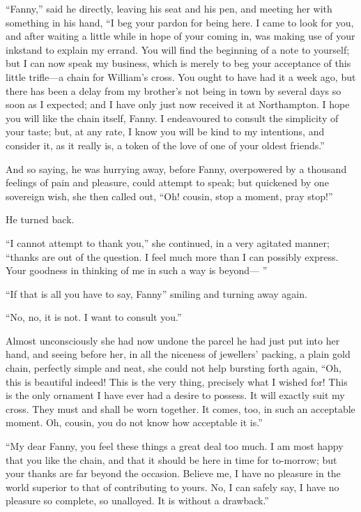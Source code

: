 \documentclass{article}
\begin{document}
``Fanny,'' said he directly, leaving his seat and his pen,
and meeting her with something in his hand, ``I beg
your pardon for being here.  I came to look for you,
and after waiting a little while in hope of your coming in,
was making use of your inkstand to explain my errand.
You will find the beginning of a note to yourself;
but I can now speak my business, which is merely to beg
your acceptance of this little trifle---a chain for
William's cross.  You ought to have had it a week ago,
but there has been a delay from my brother's not
being in town by several days so soon as I expected;
and I have only just now received it at Northampton.
I hope you will like the chain itself, Fanny.  I endeavoured
to consult the simplicity of your taste; but, at any rate,
I know you will be kind to my intentions, and consider it,
as it really is, a token of the love of one of your
oldest friends.''

And so saying, he was hurrying away, before Fanny,
overpowered by a thousand feelings of pain and pleasure,
could attempt to speak; but quickened by one sovereign wish,
she then called out, ``Oh! cousin, stop a moment,
pray stop!''

He turned back.

``I cannot attempt to thank you,'' she continued, in a
very agitated manner; ``thanks are out of the question.
I feel much more than I can possibly express.
Your goodness in thinking of me in such a way is beyond---%
''

``If that is all you have to say, Fanny'' smiling and turning
away again.

``No, no, it is not.  I want to consult you.''

Almost unconsciously she had now undone the parcel he
had just put into her hand, and seeing before her,
in all the niceness of jewellers' packing, a plain
gold chain, perfectly simple and neat, she could not help
bursting forth again, ``Oh, this is beautiful indeed!
This is the very thing, precisely what I wished for!
This is the only ornament I have ever had a desire to possess.
It will exactly suit my cross.  They must and shall be
worn together.  It comes, too, in such an acceptable moment.
Oh, cousin, you do not know how acceptable it is.''

``My dear Fanny, you feel these things a great deal too much.
I am most happy that you like the chain, and that it
should be here in time for to-morrow; but your thanks are
far beyond the occasion.  Believe me, I have no pleasure
in the world superior to that of contributing to yours.
No, I can safely say, I have no pleasure so complete,
so unalloyed.  It is without a drawback.''
\end{document}
